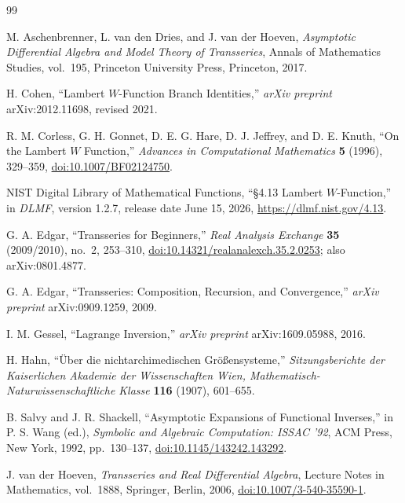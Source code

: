 \documentclass[11pt,oneside]{article}
\numberwithin{equation}{section}
\theoremstyle{definition}
\begin{document}
\clearpage
\begin{thebibliography}{99}

M. Aschenbrenner, L. van den Dries, and J. van der Hoeven,
\emph{Asymptotic Differential Algebra and Model Theory of Transseries},
Annals of Mathematics Studies, vol.~195, Princeton University Press,
Princeton, 2017.

H. Cohen,
``Lambert \(W\)-Function Branch Identities,''
\emph{arXiv preprint} arXiv:2012.11698, revised 2021.

R. M. Corless, G. H. Gonnet, D. E. G. Hare, D. J. Jeffrey, and D. E. Knuth,
``On the Lambert \(W\) Function,''
\emph{Advances in Computational Mathematics} \textbf{5} (1996), 329--359,
\href{https://doi.org/10.1007/BF02124750}{doi:10.1007/BF02124750}.

NIST Digital Library of Mathematical Functions,
``\S4.13 Lambert \(W\)-Function,'' in \emph{DLMF}, version 1.2.7,
release date June 15, 2026,
\url{https://dlmf.nist.gov/4.13}.

G. A. Edgar,
``Transseries for Beginners,''
\emph{Real Analysis Exchange} \textbf{35} (2009/2010), no.~2, 253--310,
\href{https://doi.org/10.14321/realanalexch.35.2.0253}{doi:10.14321/realanalexch.35.2.0253};
also arXiv:0801.4877.

G. A. Edgar,
``Transseries: Composition, Recursion, and Convergence,''
\emph{arXiv preprint} arXiv:0909.1259, 2009.

I. M. Gessel,
``Lagrange Inversion,''
\emph{arXiv preprint} arXiv:1609.05988, 2016.

H. Hahn,
``\"Uber die nichtarchimedischen Gr\"o\ss ensysteme,''
\emph{Sitzungsberichte der Kaiserlichen Akademie der Wissenschaften Wien,
Mathematisch-Naturwissenschaftliche Klasse} \textbf{116} (1907), 601--655.

B. Salvy and J. R. Shackell,
``Asymptotic Expansions of Functional Inverses,''
in P. S. Wang (ed.), \emph{Symbolic and Algebraic Computation: ISSAC '92},
ACM Press, New York, 1992, pp.~130--137,
\href{https://doi.org/10.1145/143242.143292}{doi:10.1145/143242.143292}.

J. van der Hoeven,
\emph{Transseries and Real Differential Algebra},
Lecture Notes in Mathematics, vol.~1888, Springer, Berlin, 2006,
\href{https://doi.org/10.1007/3-540-35590-1}{doi:10.1007/3-540-35590-1}.

\end{thebibliography}
\end{document}
